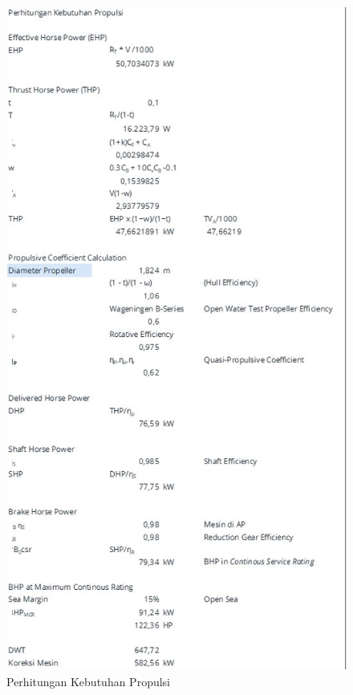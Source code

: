 \begin{figure}[!ht]
    \centering
    \includegraphics[width=\linewidth,height=\textheight,keepaspectratio]{lampiran/deskap-3.jpg}
    \caption*{Perhitungan Kebutuhan Propulsi}
\end{figure}

